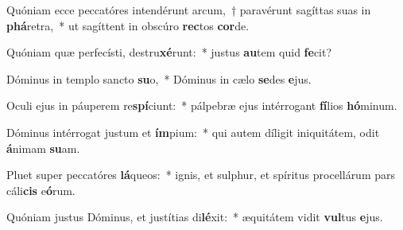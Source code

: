 \item Quóniam ecce peccatóres intendérunt arcum,~† paravérunt sagíttas suas in \textbf{phá}retra,~* ut sagíttent in obscúro \textbf{rec}tos \textbf{cor}de.
\item Quóniam quæ perfecísti, destru\textbf{xé}runt:~* justus \textbf{au}tem quid \textbf{fe}cit?
\item Dóminus in templo sancto \textbf{su}o,~* Dóminus in cælo \textbf{se}des \textbf{e}jus.
\item Oculi ejus in páuperem re\textbf{spí}ciunt:~* pálpebræ ejus intérrogant \textbf{fí}lios \textbf{hó}minum.
\item Dóminus intérrogat justum et \textbf{ím}pium:~* qui autem díligit iniquitátem, odit \textbf{á}nimam \textbf{su}am.
\item Pluet super peccatóres \textbf{lá}queos:~* ignis, et sulphur, et spíritus procellárum pars cáli\textbf{cis} e\textbf{ó}rum.
\item Quóniam justus Dóminus, et justítias di\textbf{lé}xit:~* æquitátem vidit \textbf{vul}tus \textbf{e}jus.
